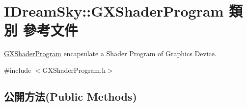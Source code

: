 \hypertarget{class_i_dream_sky_1_1_g_x_shader_program}{}\section{I\+Dream\+Sky\+:\+:G\+X\+Shader\+Program 類別 參考文件}
\label{class_i_dream_sky_1_1_g_x_shader_program}


\hyperlink{class_i_dream_sky_1_1_g_x_shader_program}{G\+X\+Shader\+Program} encapsulate a Shader Program of Graphics Device.  




{\ttfamily \#include $<$G\+X\+Shader\+Program.\+h$>$}

\subsection*{公開方法(Public Methods)}
